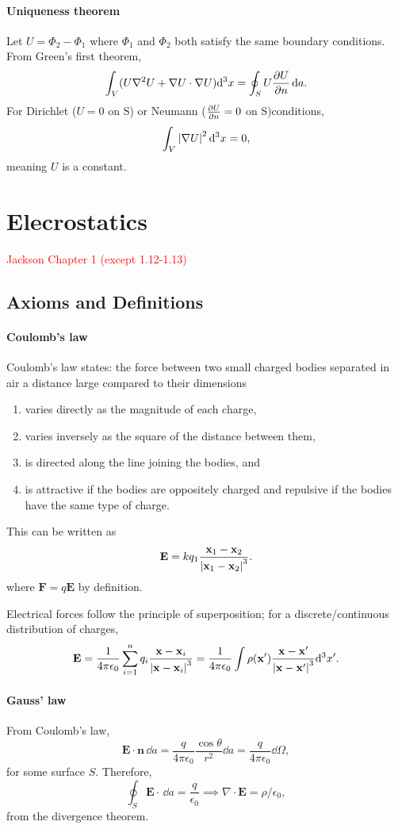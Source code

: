 \documentclass{article}
\begin{document}
\paragraph{Uniqueness theorem}
Let $U=\Phi_2-\Phi_1$ where $\Phi_1$ and $\Phi_2$ both satisfy the same boundary conditions. From Green's first theorem, 
$$\int_V(U\nabla^2U+\nabla U\cdot\nabla U)\dd^3x=\oint_SU \frac{\partial U}{\partial n}\,\dd a.$$
For Dirichlet ($U=0$ on S) or Neumann ($ \frac{\partial U}{\partial n}=0$ on S)conditions,
$$\int_V\left\lvert\nabla U\right\rvert^2\dd^3x=0,$$
meaning $U$ is a constant. 


\pagebreak

\section{Elecrostatics}
\textcolor{red}{Jackson Chapter 1 (except 1.12-1.13)}
\subsection{Axioms and Definitions}

\paragraph{Coulomb's law}

Coulomb's law states: the force between two small charged bodies separated in air a distance large compared to their dimensions
\begin{enumerate}
    \item varies directly as the magnitude of each charge,
    \item varies inversely as the square of the distance between them,
    \item is directed along the line joining the bodies, and
    \item is attractive if the bodies are oppositely charged and repulsive if the bodies have the same type of charge.
\end{enumerate}
This can be written as 
$$\mathbf E=kq_1\frac{\mathbf x_1-\mathbf x_2}{\left\lvert\mathbf x_1-\mathbf x_2\right\rvert^3}.$$
where $\mathbf F=q\mathbf E$ by definition. 

Electrical forces follow the principle of superposition; for a discrete/continuous distribution of charges,
$$\mathbf E=\frac 1{4\pi\epsilon_0}\sum^n_{i=1}q_i\frac{\mathbf x-\mathbf x_i}{\left\lvert\mathbf x-\mathbf x_i\right\rvert^3}=\frac 1{4\pi\epsilon_0}\int\rho(\mathbf x')\frac{\mathbf x-\mathbf x'}{\left\lvert\mathbf x-\mathbf x'\right\rvert^3}\dd^3x'.$$

\paragraph{Gauss' law}
From Coulomb's law,
$$\mathbf E\cdot\mathbf n\,\dd a=\frac q{4\pi\epsilon_0}\frac{\cos\theta}{r^2}\dd a=\frac q{4\pi\epsilon_0}\dd\Omega,$$
for some surface $S$. Therefore,
$$\oint_S\mathbf E\cdot\,\dd a=\frac q{\epsilon_0}\implies\nabla\cdot\mathbf E=\rho/\epsilon_0,$$
from the divergence theorem.
\end{document}
